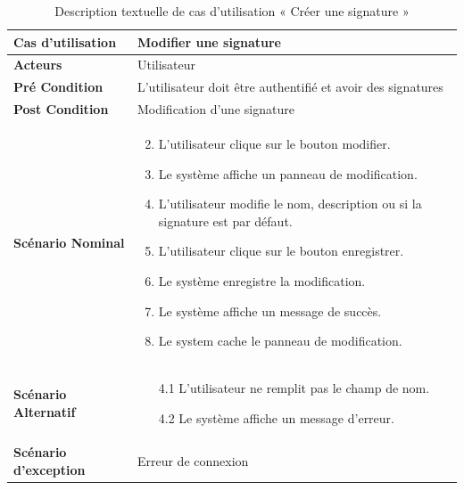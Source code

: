 \begin{longtable}{|p{5cm}|p{10cm}|}
  \caption{Description textuelle de cas d'utilisation « Créer une signature »} \label{tab:use_case_update_signature}\\
\hline
\textbf{Cas d'utilisation}&Modifier une signature\\
\hline
\textbf{Acteurs}&Utilisateur\\
\hline
\textbf{Pré Condition}&L'utilisateur doit être authentifié et avoir des signatures\\
\hline
\textbf{Post Condition}&Modification d'une signature\\
\hline
\textbf{Scénario Nominal}&
\vspace{-\baselineskip}
\begin{enumerate}
    \setcounter{enumi}{1}
  \item L'utilisateur clique sur le bouton modifier.
  \item Le système affiche un panneau de modification.
  \item L'utilisateur modifie le nom, description ou si la signature est par défaut.
  \item L'utilisateur clique sur le bouton enregistrer.
  \item Le système enregistre la modification.
  \item Le système affiche un message de succès.
  \item Le system cache le panneau de modification.
\end{enumerate}\\
\hline
\textbf{Scénario Alternatif}&
\vspace{-\baselineskip}
\begin{enumerate}
      \item [4.1] L'utilisateur ne remplit pas le champ de nom.
      \item [4.2] Le système affiche un message d'erreur.
\end{enumerate}\\
\hline
\textbf{Scénario d'exception}&Erreur de connexion\\
\hline

\end{longtable}



